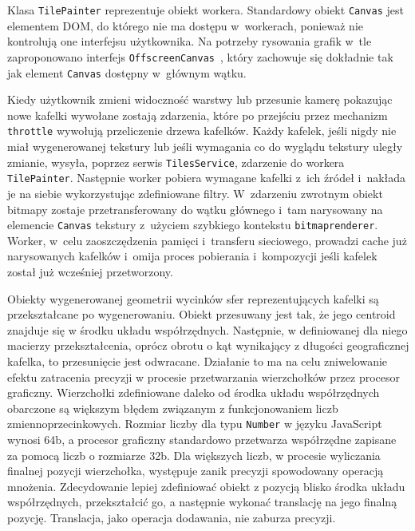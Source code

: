 Klasa \texttt{TilePainter} reprezentuje obiekt workera. Standardowy obiekt \texttt{Canvas} jest elementem DOM, do którego nie ma dostępu w~workerach, ponieważ nie kontrolują one interfejsu użytkownika. Na potrzeby rysowania grafik w~tle zaproponowano interfejs \texttt{OffscreenCanvas}~\cite{OffscreenCanvas}, który zachowuje się dokładnie tak jak element \texttt{Canvas} dostępny w~głównym wątku.

Kiedy użytkownik zmieni widoczność warstwy lub przesunie kamerę pokazując nowe kafelki wywołane zostają zdarzenia, które po przejściu przez mechanizm \texttt{throttle} wywołują przeliczenie drzewa kafelków. Każdy kafelek, jeśli nigdy nie miał wygenerowanej tekstury lub jeśli wymagania co do wyglądu tekstury uległy zmianie, wysyła, poprzez serwis \texttt{TilesService}, zdarzenie do workera \texttt{TilePainter}. Następnie worker pobiera wymagane kafelki z~ich źródeł i~nakłada je na siebie wykorzystując zdefiniowane filtry. W~zdarzeniu zwrotnym obiekt bitmapy zostaje przetransferowany do wątku głównego i~tam narysowany na elemencie \texttt{Canvas} tekstury z~użyciem szybkiego kontekstu \texttt{bitmaprenderer}. Worker, w~celu zaoszczędzenia pamięci i~transferu sieciowego, prowadzi cache już narysowanych kafelków i~omija proces pobierania i~kompozycji jeśli kafelek został już wcześniej przetworzony.

Obiekty wygenerowanej geometrii wycinków sfer reprezentujących kafelki są przekształcane po wygenerowaniu. Obiekt przesuwany jest tak, że jego centroid znajduje się w środku układu współrzędnych. Następnie, w definiowanej dla niego macierzy przekształcenia, oprócz obrotu o kąt wynikający z długości geograficznej kafelka, to przesunięcie jest odwracane. Działanie to ma na celu zniwelowanie efektu zatracenia precyzji w procesie przetwarzania wierzchołków przez procesor graficzny. Wierzchołki zdefiniowane daleko od środka układu współrzędnych obarczone są większym błędem związanym z funkcjonowaniem liczb zmiennoprzecinkowych. Rozmiar liczby dla typu \texttt{Number} w języku JavaScript wynosi 64b, a procesor graficzny standardowo przetwarza współrzędne zapisane za pomocą liczb o rozmiarze 32b. Dla większych liczb, w procesie wyliczania finalnej pozycji wierzchołka, występuje zanik precyzji spowodowany operacją mnożenia. Zdecydowanie lepiej zdefiniować obiekt z pozycją blisko środka układu współrzędnych, przekształcić go, a następnie wykonać translację na jego finalną pozycję. Translacja, jako operacja dodawania, nie zaburza precyzji.